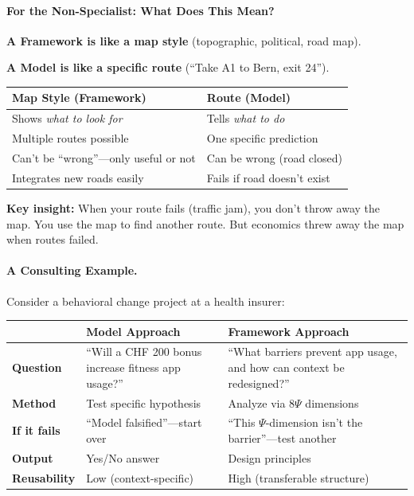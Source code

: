 \paragraph{For the Non-Specialist: What Does This Mean?}

\begin{tcolorbox}[colback=gray!5!white, colframe=gray!75!black,
    title=\textbf{The Map Analogy}]

\textbf{A Framework is like a map style} (topographic, political, road map).

\textbf{A Model is like a specific route} (``Take A1 to Bern, exit 24'').

\vspace{0.5em}
\begin{tabular}{@{}p{6cm}p{6cm}@{}}
\textbf{Map Style (Framework)} & \textbf{Route (Model)} \\
\midrule
Shows \textit{what to look for} & Tells \textit{what to do} \\
Multiple routes possible & One specific prediction \\
Can't be ``wrong''---only useful or not & Can be wrong (road closed) \\
Integrates new roads easily & Fails if road doesn't exist \\
\end{tabular}

\vspace{0.5em}
\textbf{Key insight:} When your route fails (traffic jam), you don't throw away the map.
You use the map to find another route. But economics threw away the map when routes failed.

\end{tcolorbox}

\paragraph{A Consulting Example.}

Consider a behavioral change project at a health insurer:

\begin{center}
\renewcommand{\arraystretch}{1.3}
\begin{tabular}{@{}p{2.5cm}p{5cm}p{5cm}@{}}
\toprule
& \textbf{Model Approach} & \textbf{Framework Approach} \\
\midrule
\textbf{Question} & ``Will a CHF 200 bonus increase fitness app usage?'' & ``What barriers prevent app usage, and how can context be redesigned?'' \\
\textbf{Method} & Test specific hypothesis & Analyze via 8$\Psi$ dimensions \\
\textbf{If it fails} & ``Model falsified''---start over & ``This $\Psi$-dimension isn't the barrier''---test another \\
\textbf{Output} & Yes/No answer & Design principles \\
\textbf{Reusability} & Low (context-specific) & High (transferable structure) \\
\bottomrule
\end{tabular}
\end{center}


